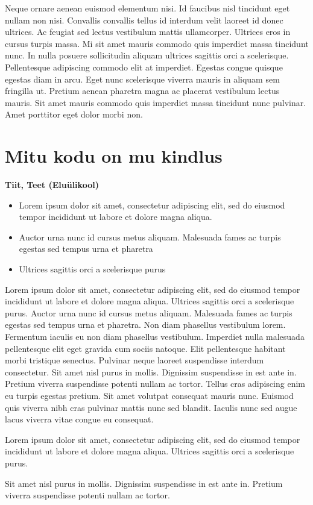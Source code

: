\documentclass[]{book}
\begin{document}
Neque ornare aenean euismod elementum nisi. Id faucibus nisl tincidunt eget nullam non nisi. Convallis convallis tellus id interdum velit laoreet id donec ultrices. Ac feugiat sed lectus vestibulum mattis ullamcorper. Ultrices eros in cursus turpis massa. Mi sit amet mauris commodo quis imperdiet massa tincidunt nunc. In nulla posuere sollicitudin aliquam ultrices sagittis orci a scelerisque. Pellentesque adipiscing commodo elit at imperdiet. Egestas congue quisque egestas diam in arcu. Eget nunc scelerisque viverra mauris in aliquam sem fringilla ut. Pretium aenean pharetra magna ac placerat vestibulum lectus mauris. Sit amet mauris commodo quis imperdiet massa tincidunt nunc pulvinar. Amet porttitor eget dolor morbi non.

\hypertarget{chapter51}{%
\section{Mitu kodu on mu kindlus}\label{chapter51}}

\begin{authors}
\textbf{Tiit, Teet (Eluülikool)}
\end{authors}

\begin{points}
\begin{itemize}
\item
  Lorem ipsum dolor sit amet, consectetur adipiscing elit, sed do
  eiusmod tempor incididunt ut labore et dolore magna aliqua.
\item
  Auctor urna nunc id cursus metus aliquam. Malesuada fames ac turpis
  egestas sed tempus urna et pharetra
\item
  Ultrices sagittis orci a scelerisque purus
\end{itemize}
\end{points}

Lorem ipsum dolor sit amet, consectetur adipiscing elit, sed do eiusmod tempor incididunt ut labore et dolore magna aliqua. Ultrices sagittis orci a scelerisque purus. Auctor urna nunc id cursus metus aliquam. Malesuada fames ac turpis egestas sed tempus urna et pharetra. Non diam phasellus vestibulum lorem. Fermentum iaculis eu non diam phasellus vestibulum. Imperdiet nulla malesuada pellentesque elit eget gravida cum sociis natoque. Elit pellentesque habitant morbi tristique senectus. Pulvinar neque laoreet suspendisse interdum consectetur. Sit amet nisl purus in mollis. Dignissim suspendisse in est ante in. Pretium viverra suspendisse potenti nullam ac tortor. Tellus cras adipiscing enim eu turpis egestas pretium. Sit amet volutpat consequat mauris nunc. Euismod quis viverra nibh cras pulvinar mattis nunc sed blandit. Iaculis nunc sed augue lacus viverra vitae congue eu consequat.

\begin{blockquote}
Lorem ipsum dolor sit amet, consectetur adipiscing elit, sed do eiusmod
tempor incididunt ut labore et dolore magna aliqua. Ultrices sagittis
orci a scelerisque purus.
\end{blockquote}

Sit amet nisl purus in mollis. Dignissim suspendisse in est ante in. Pretium viverra suspendisse potenti nullam ac tortor.

\printbibliography
\end{document}
